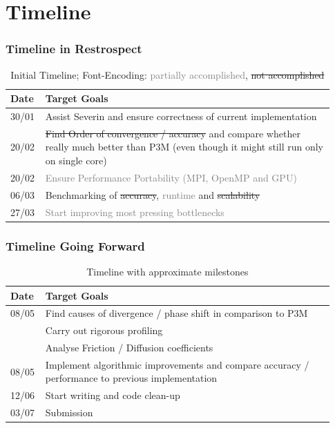 \documentclass[.08pt,aspectratio=169,t]{beamer}
\begin{document}
\section{Timeline}

\begin{frame}
\frametitle{Timeline in Restrospect}
\begin{table}[]
\def\arraystretch{1.5}
\begin{tabular}{p{0.08\linewidth} | p{0.85\linewidth}}
Date & Target Goals \\
\hline \hline
30/01 & Assist Severin and ensure correctness of current implementation \\
20/02 & \sout{Find Order of convergence / accuracy} and compare whether really much better than P3M (even though it might still run only on single core) \\
20/02 & \textcolor{gray}{Ensure Performance Portability (MPI, OpenMP and GPU)} \\
06/03 & Benchmarking of \sout{accuracy}, \textcolor{gray}{runtime} and \sout{scalability} \\
27/03 & \textcolor{gray}{Start improving most pressing bottlenecks} \\
\end{tabular}
\caption{Initial Timeline; Font-Encoding: \textcolor{gray}{partially accomplished}, \sout{not accomplished} }
\end{table}

\end{frame}

\begin{frame}
\frametitle{Timeline Going Forward}

\begin{table}[]
\def\arraystretch{1.5}
\begin{tabular}{p{0.08\linewidth} | p{0.85\linewidth}}
Date & Target Goals \\
\hline \hline
08/05 & Find causes of divergence / phase shift in comparison to P3M \\
      & Carry out rigorous profiling \\
      & Analyse Friction / Diffusion coefficients \\
08/05 & Implement algorithmic improvements and compare accuracy / performance to previous implementation \\
12/06 & Start writing and code clean-up \\
03/07 & Submission \\
\end{tabular}
\caption{Timeline with approximate milestones}
\end{table}

\end{frame}
\end{document}
